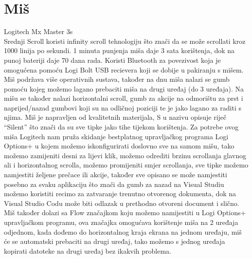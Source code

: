 \documentclass{report}
\begin{document}
\chapter{Miš}
 Logitech Mx Master 3s
\\Srednji Scroll koristi infinity scroll tehnologiju što znači da se može scrollati kroz 1000 linija po sekundi. 1 minuta punjenja miša daje 3 sata korištenja, dok na punoj bateriji daje 70 dana rada. Koristi Bluetooth za povezivost koja je omogućena pomoću Logi Bolt USB recievera koji se dobije u pakiranju s mišem. Miš podržava više operativnih sustava, također na dnu miša nalazi se gumb pomoću kojeg možemo lagano prebaciti miša na drugi uređaj (do 3 uređaja). Na mišu se također nalazi horizontalni scroll, gumb za akcije na odmorištu za prst i naprijed/nazad gumbovi koji su na odličnoj poziciji te je jako lagano za raditi s njima. Miš je napravljen od kvalitetnih materijala, S u nazivu opisuje riječ “Silent” što znači da su sve tipke jako tihe tijekom korištenja. Za potrebe ovog miša Logitech nam pruža skidanje bestplatnog upravljačkog programa Logi Options+ u kojem možemo iskonfigurirati doslovno sve na samom mišu, tako možemo zamijeniti desni za lijevi klik, možemo odrediti brzinu scrollanja glavnog ali i horizontalnog scrolla, možemo promijeniti smjer scrollanja, sve tipke možemo namjestiti željene prečace ili akcije, također sve opisano se može namjestiti posebno za svaku aplikaciju što znači da gumb za nazad na Visual Studiu možemo koristiti recimo za zatvaranje trenutno otvorenog dokumenta, dok na Visual Studio Codu može biti odlazak u prethodno otvoreni document i slično. Miš također dolazi sa Flow značajkom koju možemo namijestiti u Logi Options+ upravljačkom programu, ova značajka omogućava korištenje miša na 2 uređaja odjednom, kada dođemo do horizontalnog kraja ekrana na jednom uređaju, miš će se automatski prebaciti na drugi uređaj, tako možemo s jednog uređaja kopirati datoteke na drugi uređaj bez ikakvih problema.
\end{document}
